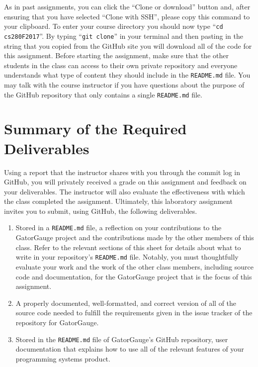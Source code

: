 \documentclass[11pt]{article}
\newcommand{\reflection}{\lstinline{README.md}}
\newcommand{\command}[1]{``\lstinline{#1}''}
\begin{document}
As in past assignments, you can click the ``Clone or download'' button and, after ensuring that you have selected
``Clone with SSH'', please copy this command to your clipboard. To enter your course directory you should now type
\command{cd cs280F2017}. By typing \command{git clone} in your terminal and then pasting in the string that you copied
from the GitHub site you will download all of the code for this assignment. Before starting the assignment, make sure
that the other students in the class can access to their own private repository and everyone understands what type of
content they should include in the \reflection{} file. You may talk with the course instructor if you have questions
about the purpose of the GitHub repository that only contains a single \reflection{} file.

\section*{Summary of the Required Deliverables}

Using a report that the instructor shares with you through the commit log in GitHub, you will privately received a grade
on this assignment and feedback on your deliverables. The instructor will also evaluate the effectiveness with which the
class completed the assignment. Ultimately, this laboratory assignment invites you to submit, using GitHub, the
following deliverables.

\vspace*{-.5em}

\begin{enumerate}

\setlength{\itemsep}{0in}

\item Stored in a \reflection{} file, a reflection on your contributions to the GatorGauge project and the contributions
  made by the other members of this class. Refer to the relevant sections of this sheet for details about what to write
  in your repository's \reflection{} file. Notably, you must thoughtfully evaluate your work and the work of the other
  class members, including source code and documentation, for the GatorGauge project that is the focus of this
  assignment.

\item A properly documented, well-formatted, and correct version of all of the source code needed to fulfill the
  requirements given in the issue tracker of the repository for GatorGauge.

\item Stored in the \reflection{} file of GatorGauge's GitHub repository, user documentation that explains how to use
  all of the relevant features of your programming systems product.

\end{enumerate}
\end{document}
